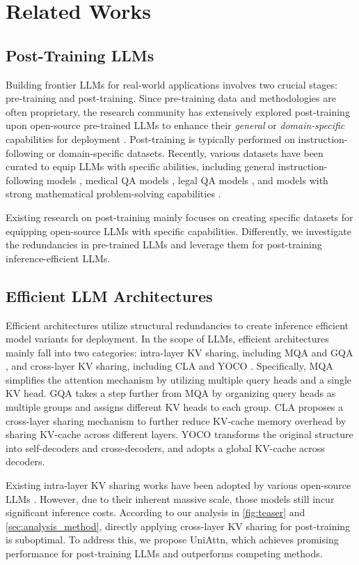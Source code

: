 \section{Related Works}
\subsection{Post-Training LLMs}

Building frontier LLMs for real-world applications involves two crucial stages: pre-training and post-training. Since pre-training data and methodologies are often proprietary, the research community has extensively explored post-training upon open-source pre-trained LLMs \citep{LLaMA3,Gemma2,Mistral} to enhance their \textit{general} or \textit{domain-specific} capabilities for deployment \citep{lian2024breakingstagebarriernovel}.
Post-training is typically performed on instruction-following or domain-specific datasets.
Recently, various datasets have been curated to equip LLMs with specific abilities, including general instruction-following models \citep{Hermes, TULU3, InfinityInstruct2024}, medical QA models \citep{PMC, Aloe, singhal2023expertlevelmedicalquestionanswering}, legal QA models \citep{LawyerLLaMA, LawGPT}, and models with strong mathematical problem-solving capabilities \citep{Goat}.

Existing research on post-training mainly focuses on creating specific datasets for equipping open-source LLMs with specific capabilities. 
Differently, we investigate the redundancies in pre-trained LLMs and leverage them for post-training inference-efficient LLMs.

\subsection{Efficient LLM Architectures}
Efficient architectures utilize structural redundancies to create inference efficient model variants \citep{ToMe,PYRA} for deployment.
In the scope of LLMs, efficient architectures mainly fall into two categories: intra-layer KV sharing, including MQA \citep{MQA} and GQA \citep{GQA}, and cross-layer KV sharing, including CLA \citep{CLA} and YOCO \citep{YOCO}.
Specifically, MQA \citep{MQA} simplifies the attention mechanism by utilizing multiple query heads and a single KV head. 
GQA \citep{GQA} takes a step further from MQA by organizing query heads as multiple groups and assigns different KV heads to each group.
CLA \citep{CLA} proposes a cross-layer sharing mechanism to further reduce KV-cache memory overhead by sharing KV-cache across different layers. 
YOCO \citep{YOCO} transforms the original structure into self-decoders and cross-decoders, and adopts a global KV-cache across decoders.

Existing intra-layer KV sharing works have been adopted by various open-source LLMs \citep{LLaMA3,Mistral,Gemma2}. However, due to their inherent massive scale, those models still incur significant inference costs. According to our analysis in \cref{fig:teaser} and \cref{sec:analysis_method}, directly applying cross-layer KV sharing for post-training is suboptimal. To address this, we propose UniAttn, which achieves promising performance for post-training LLMs and outperforms competing methods.